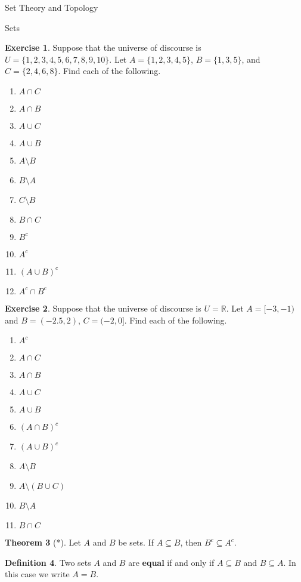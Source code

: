 \documentclass[11pt]{article}
\theoremstyle{definition}
\newtheorem{theorem}{Theorem}[section]
\newtheorem{definition}[theorem]{Definition}
\newtheorem{exercise}[theorem]{Exercise}
\begin{document}
\begin{section}{Set Theory and Topology}
\begin{subsection}{Sets}
\begin{exercise}
Suppose that the universe of discourse is $U=\{1,2,3,4,5,6,7,8,9,10\}$.  Let $A=\{1, 2, 3, 4, 5\}$, $B=\{1, 3, 5\}$, and $C=\{2, 4, 6, 8\}$.  Find each of the following.
\begin{enumerate}
  \item $A \cap C$
  \item $A \cap B$
  \item $A \cup C$
  \item $A \cup B$
  \item $A\setminus B$
  \item $B \setminus A$
  \item $C \setminus B$
  \item $B \cap C$
  \item $B^c$
  \item $A^c$
  \item $(A\cup B)^c$
  \item $A^c\cap B^c$
\end{enumerate}
\end{exercise}

\begin{exercise}
Suppose that the universe of discourse is $U=\mathbb{R}$.  Let $A=[-3,-1)$ and $B=(-2.5,2)$, $C=(-2,0]$.  Find each of the following.
\begin{enumerate}
\item $A^c$
  \item $A \cap C$
  \item $A \cap B$
  \item $A \cup C$
  \item $A \cup B$
  \item $(A\cap B)^c$
  \item $(A\cup B)^c$
  \item $A \setminus B$
  \item $A\setminus (B \cup C)$
  \item $B \setminus A$
  \item $B \cap C$
\end{enumerate}
\end{exercise}

\begin{theorem}[*]
Let $A$ and $B$ be sets.  If $A \subseteq B$, then $B^c \subseteq A^c$.
\end{theorem}

\begin{definition}
Two sets $A$ and $B$ are \textbf{equal} if and only if $A \subseteq B$ and $B \subseteq A$.  In this case we write $A = B$.
\end{definition}


\end{subsection}
\end{section}
\end{document}
